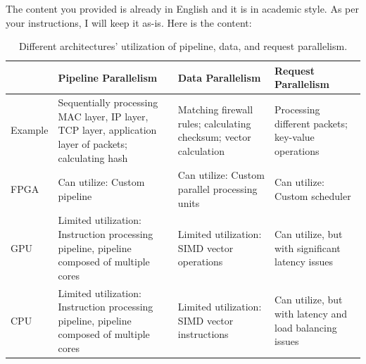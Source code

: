 The content you provided is already in English and it is in academic style. As per your instructions, I will keep it as-is. Here is the content:

\begin{table}[htbp]
	\centering
	\caption{Different architectures' utilization of pipeline, data, and request parallelism.}
	\small
	\begin{tabular}{l|p{}|p{}|p{}}
		\hline
		& Pipeline Parallelism & Data Parallelism & Request Parallelism \\
		\hline
		\hline
		Example & Sequentially processing MAC layer, IP layer, TCP layer, application layer of packets; calculating hash & Matching firewall rules; calculating checksum; vector calculation & Processing different packets; key-value operations \\
		\hline
		FPGA & Can utilize: Custom pipeline & Can utilize: Custom parallel processing units & Can utilize: Custom scheduler \\
		\hline
		GPU & Limited utilization: Instruction processing pipeline, pipeline composed of multiple cores & Limited utilization: SIMD vector operations & Can utilize, but with significant latency issues \\
		\hline
		CPU & Limited utilization: Instruction processing pipeline, pipeline composed of multiple cores & Limited utilization: SIMD vector instructions & Can utilize, but with latency and load balancing issues \\
		\hline
	\end{tabular}
	\label{background:tab:fpga-parallelism}
\end{table}


